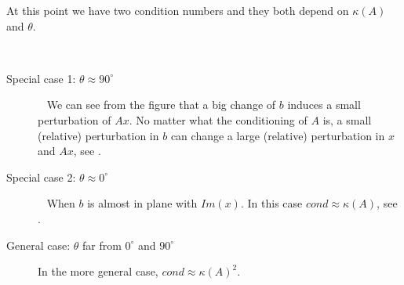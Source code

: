 \documentclass[computational_mathematics.tex]{subfiles}
\begin{document}
At this point we have two condition numbers and they both depend on $\kappa(A)$ and $\theta$.

\begin{obs}~%
  \begin{description}
    \item[{\sc Special case 1: $\theta \approx 90^\circ$}]~%
      We can see from the figure that a big change of $b$ induces a small perturbation of $Ax$. No matter what the conditioning of $A$ is, a small (relative) perturbation in $b$ can change a large (relative) perturbation in $x$ and $Ax$, see .
    \item[{\sc Special case 2: $\theta \approx 0^\circ$}]~%
      When $b$ is almost in plane with $Im(x)$. In this case $cond \approx \kappa(A)$, see .
    \item[{\sc General case: $\theta$ far from $0^\circ$ and $90^\circ$}]
      In the more general case, $cond \approx \kappa(A)^2$.
  \end{description}
\end{obs}
\end{document}

